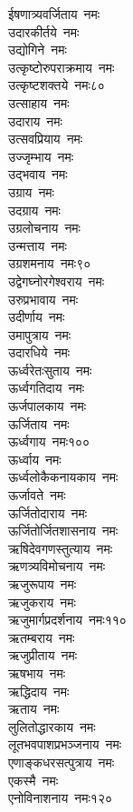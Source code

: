 \begin{multicols}{\maxColumns}
\begin{flushleft}
ईषणात्र्यवर्जिताय~नमः\\
उदारकीर्तये~नमः\\
उद्योगिने~नमः\\
उत्कृष्टोरुपराक्रमाय~नमः\\
उत्कृष्टशक्तये~नमः\hfill ८०\\
उत्साहाय~नमः\\
उदाराय~नमः\\
उत्सवप्रियाय~नमः\\
उज्जृम्भाय~नमः\\
उद्भवाय~नमः\\
उग्राय~नमः\\
उदग्राय~नमः\\
उग्रलोचनाय~नमः\\
उन्मत्ताय~नमः\\
उग्रशमनाय~नमः\hfill ९०\\
उद्वेगघ्नोरगेश्वराय~नमः\\
उरुप्रभावाय~नमः\\
उदीर्णाय~नमः\\
उमापुत्राय~नमः\\
उदारधिये~नमः\\
ऊर्ध्वरेतःसुताय~नमः\\
ऊर्ध्वगतिदाय~नमः\\
ऊर्जपालकाय~नमः\\
ऊर्जिताय~नमः\\
ऊर्ध्वगाय~नमः\hfill १००\\
ऊर्ध्वाय~नमः\\
ऊर्ध्वलोकैकनायकाय~नमः\\
ऊर्जावते~नमः\\
ऊर्जितोदाराय~नमः\\
ऊर्जितोर्जितशासनाय~नमः\\
ऋषिदेवगणस्तुत्याय~नमः\\
ऋणत्र्यविमोचनाय~नमः\\
ऋजुरूपाय~नमः\\
ऋजुकराय~नमः\\
ऋजुमार्गप्रदर्शनाय~नमः\hfill ११०\\
ऋतम्बराय~नमः\\
ऋजुप्रीताय~नमः\\
ऋषभाय~नमः\\
ऋद्धिदाय~नमः\\
ऋताय~नमः\\
लुलितोद्धारकाय~नमः\\
लूतभवपाशप्रभञ्जनाय~नमः\\
एणाङ्कधरसत्पुत्राय~नमः\\
एकस्मै~नमः\\
एनोविनाशनाय~नमः\hfill १२०\\

\end{flushleft}
\end{multicols}
